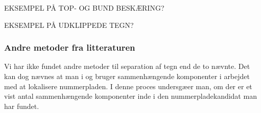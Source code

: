 EKSEMPEL PÅ TOP- OG BUND BESKÆRING?

EKSEMPEL PÅ UDKLIPPEDE TEGN?

\subsubsection{Andre metoder fra litteraturen}

Vi har ikke fundet andre metoder til separation af tegn end de to nævnte. Det kan dog nævnes at man i \cite{parker} og \cite{kwas} bruger sammenhængende komponenter i arbejdet med at lokalisere nummerpladen. I denne proces undersgæer man, om der er et vist antal sammenhængende komponenter inde i den nummerpladekandidat man har fundet.

